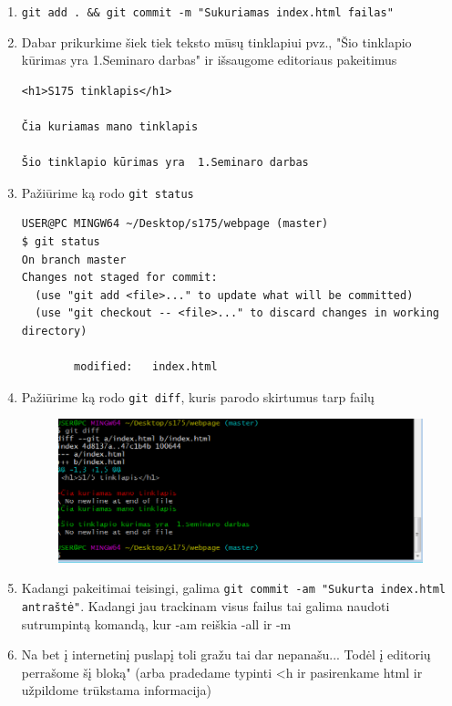 \documentclass[12pt,a4paper]{article}
\begin{document}
\begin{enumerate}
\item \colorbox{listinggray}{\lstinline|git add . && git commit -m "Sukuriamas index.html failas"|}

\item Dabar prikurkime šiek tiek teksto mūsų tinklapiui pvz., "Šio tinklapio kūrimas yra  1.Seminaro darbas" ir išsaugome editoriaus pakeitimus

\begin{lstlisting}
<h1>S175 tinklapis</h1>

Čia kuriamas mano tinklapis

Šio tinklapio kūrimas yra  1.Seminaro darbas
\end{lstlisting}

\item Pažiūrime ką rodo \colorbox{listinggray}{\lstinline|git status|}


\begin{lstlisting}
USER@PC MINGW64 ~/Desktop/s175/webpage (master)
$ git status
On branch master
Changes not staged for commit:
  (use "git add <file>..." to update what will be committed)
  (use "git checkout -- <file>..." to discard changes in working directory)

        modified:   index.html
\end{lstlisting}

\item Pažiūrime ką rodo \colorbox{listinggray}{\lstinline|git diff|}, kuris parodo skirtumus tarp failų

\begin{figure}[ht]
\center
\includegraphics[scale=0.4]{webpage_4.png}
\end{figure}

\item Kadangi pakeitimai teisingi, galima \colorbox{listinggray}{\lstinline|git commit -am "Sukurta index.html antraštė"|}. Kadangi jau trackinam visus failus tai galima naudoti sutrumpintą komandą, kur -am reiškia -all ir -m

\item Na bet į internetinį puslapį toli gražu tai dar nepanašu... Todėl į editorių perrašome šį bloką" (arba pradedame typinti <h ir pasirenkame html ir užpildome trūkstama informacija)


\end{enumerate}
\end{document}
